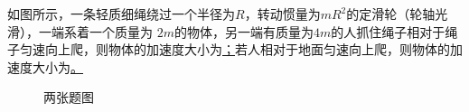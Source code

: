 如图所示，一条轻质细绳绕过一个半径为$R$，转动惯量为$mR^2$的定滑轮（轮轴光滑），一端系着一个质量为 $2m$的物体，另一端有质量为$4m$的人抓住绳子相对于绳子匀速向上爬，则物体的加速度大小为\ul；若人相对于地面匀速向上爬，则物体的加速度大小为\ul。
\begin{figure}[!h]
	\centering
	\quad
	\caption{两张题图}
\end{figure}

